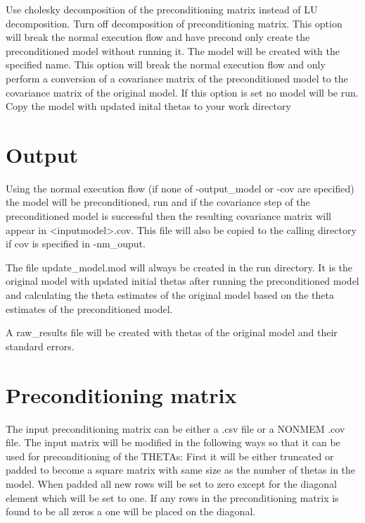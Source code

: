 \begin{optionlist}
Use cholesky decomposition of the preconditioning matrix instead of LU decomposition.
Turn off decomposition of preconditioning matrix.
This option will break the normal execution flow and have precond only create the preconditioned model without running it.
The model will be created with the specified name.
This option will break the normal execution flow and only perform a conversion of a covariance matrix of the preconditioned model to the covariance matrix of the original model.
If this option is set no model will be run.
Copy the model with updated inital thetas to your work directory
\end{optionlist}

\section{Output}

Using the normal execution flow (if none of -output\_model or -cov are specified) the model will be preconditioned, run and if the covariance step of the preconditioned model is successful then the resulting covariance matrix will appear in <inputmodel>.cov. This file will also be copied to the calling
directory if cov is specified in -nm\_ouput.

The file update\_model.mod will always be created in the run directory. It is the original model with updated initial thetas after
running the preconditioned model and calculating the theta estimates of the original model based on the theta estimates of the preconditioned model.

A raw\_results file will be created with thetas of the original model and their standard errors.

\section{Preconditioning matrix}

The input preconditioning matrix can be either a .csv file or a NONMEM .cov file. The input matrix will be modified in the following ways so that it can be used for preconditioning of the THETAs:
First it will be either truncated or padded to become a square matrix with same size as the number of thetas in the model.
When padded all new rows will be set to zero except for the diagonal element which will be set to one. If any rows in the preconditioning matrix is found
to be all zeros a one will be placed on the diagonal.

